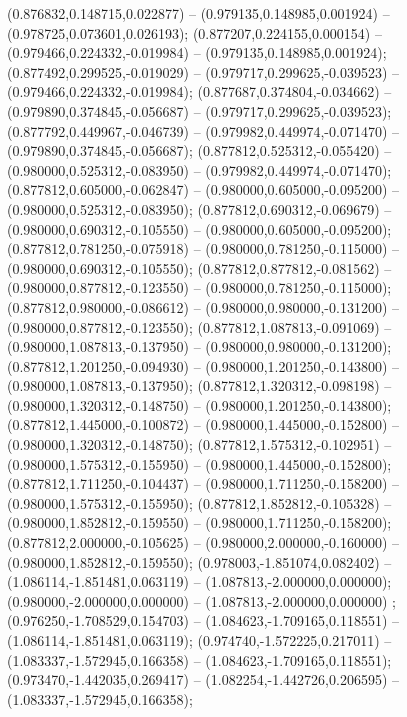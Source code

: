  (0.876832,0.148715,0.022877) -- (0.979135,0.148985,0.001924) -- (0.978725,0.073601,0.026193);
 (0.877207,0.224155,0.000154) -- (0.979466,0.224332,-0.019984) -- (0.979135,0.148985,0.001924);
 (0.877492,0.299525,-0.019029) -- (0.979717,0.299625,-0.039523) -- (0.979466,0.224332,-0.019984);
 (0.877687,0.374804,-0.034662) -- (0.979890,0.374845,-0.056687) -- (0.979717,0.299625,-0.039523);
 (0.877792,0.449967,-0.046739) -- (0.979982,0.449974,-0.071470) -- (0.979890,0.374845,-0.056687);
 (0.877812,0.525312,-0.055420) -- (0.980000,0.525312,-0.083950) -- (0.979982,0.449974,-0.071470);
 (0.877812,0.605000,-0.062847) -- (0.980000,0.605000,-0.095200) -- (0.980000,0.525312,-0.083950);
 (0.877812,0.690312,-0.069679) -- (0.980000,0.690312,-0.105550) -- (0.980000,0.605000,-0.095200);
 (0.877812,0.781250,-0.075918) -- (0.980000,0.781250,-0.115000) -- (0.980000,0.690312,-0.105550);
 (0.877812,0.877812,-0.081562) -- (0.980000,0.877812,-0.123550) -- (0.980000,0.781250,-0.115000);
 (0.877812,0.980000,-0.086612) -- (0.980000,0.980000,-0.131200) -- (0.980000,0.877812,-0.123550);
 (0.877812,1.087813,-0.091069) -- (0.980000,1.087813,-0.137950) -- (0.980000,0.980000,-0.131200);
 (0.877812,1.201250,-0.094930) -- (0.980000,1.201250,-0.143800) -- (0.980000,1.087813,-0.137950);
 (0.877812,1.320312,-0.098198) -- (0.980000,1.320312,-0.148750) -- (0.980000,1.201250,-0.143800);
 (0.877812,1.445000,-0.100872) -- (0.980000,1.445000,-0.152800) -- (0.980000,1.320312,-0.148750);
 (0.877812,1.575312,-0.102951) -- (0.980000,1.575312,-0.155950) -- (0.980000,1.445000,-0.152800);
 (0.877812,1.711250,-0.104437) -- (0.980000,1.711250,-0.158200) -- (0.980000,1.575312,-0.155950);
 (0.877812,1.852812,-0.105328) -- (0.980000,1.852812,-0.159550) -- (0.980000,1.711250,-0.158200);
 (0.877812,2.000000,-0.105625) -- (0.980000,2.000000,-0.160000) -- (0.980000,1.852812,-0.159550);
 (0.978003,-1.851074,0.082402) -- (1.086114,-1.851481,0.063119) -- (1.087813,-2.000000,0.000000);
 (0.980000,-2.000000,0.000000) -- (1.087813,-2.000000,0.000000) ;
 (0.976250,-1.708529,0.154703) -- (1.084623,-1.709165,0.118551) -- (1.086114,-1.851481,0.063119);
 (0.974740,-1.572225,0.217011) -- (1.083337,-1.572945,0.166358) -- (1.084623,-1.709165,0.118551);
 (0.973470,-1.442035,0.269417) -- (1.082254,-1.442726,0.206595) -- (1.083337,-1.572945,0.166358);
